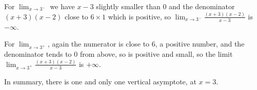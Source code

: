 \documentclass{article}
\newcommand{\ds}{\displaystyle}
\begin{document}
\begin{enumerate}
  For $\ds \lim_{x\to 3^-}$ we have $x-3$ slightly smaller than $0$ and
  the denominator $(x+3)(x-2)$ close to $6\times 1$ which is positive,
  so $\ds \lim_{x\to 3^-} \frac{(x+3)(x-2)}{x-3}$ is $-\infty$.

  For $\ds \lim_{x\to 3^+}$, again the numerator is close to $6$, a positive
  number, and the denominator tends to $0$ from above, so is positive and small,
  so the limit
  $\ds \lim_{x\to 3^+} \frac{(x+3)(x-2)}{x-3}$ is $+\infty$.

  In summary, there is one and only one vertical asymptote, at $x=3$.  
\end{enumerate}
\end{document}
